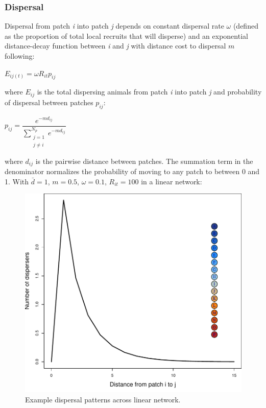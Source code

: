 \documentclass[]{article}
\begin{document}
\subsubsection{Dispersal}\label{dispersal}

Dispersal from patch \emph{i} into patch \emph{j} depends on constant
dispersal rate \(\omega\) (defined as the proportion of total local
recruits that will disperse) and an exponential distance-decay function
between \emph{i} and \emph{j} with distance cost to dispersal \(m\)
following:

\(E_{ij(t)}=\omega R_{it}p_{ij}\)

where \(E_{ij}\) is the total dispersing animals from patch \emph{i}
into patch \emph{j} and probability of dispersal between patches
\(p_{ij}\):

\(p_{ij}=\dfrac{e^{-md_{ij}}}{\sum\limits_{\substack{j=1 \\ j\neq i}}^{N_p} e^{-md_{ij}}}\)

where \(d_{ij}\) is the pairwise distance between patches. The summation
term in the denominator normalizes the probability of moving to any
patch to between 0 and 1. With \(\bar{d}= 1\), \(m=0.5\),
\(\omega=0.1\), \(R_{it}=100\) in a linear network:

\begin{figure}[H]

{\centering \includegraphics{Managing_for_ecological_surprises_in_metapopulations_makeHTML_files/figure-latex/dispersal-1} 

}

\caption{Example dispersal patterns across linear network.}\label{fig:dispersal}
\end{figure}
\end{document}
